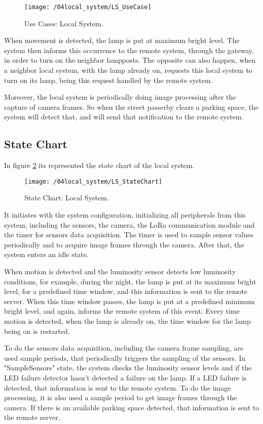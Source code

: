 \begin{figure}[ht] 
	\centering
	\texttt{[image: /04local\_system/LS\_UseCase]}
	\caption{Use Cases: Local System.}
	\label{fig:ls_use_cases}
\end{figure}

When movement is detected, the lamp is put at maximum bright level. The system then informs this occurrence to the remote system, through the gateway, in order to turn on the neighbor lampposts. The opposite can also happen, when a neighbor local system, with the lamp already on, requests this local system to turn on its lamp, being this request handled by the remote system. 

Moreover, the local system is periodically doing image processing after the capture of camera frames. So when the street passerby clears a parking space, the system will detect that, and will send that notification to the remote system.

\clearpage
\subsection{State Chart}
In figure \ref{fig:ls_state_chart} its represented the state chart of the local system. 

\begin{figure}[H]
	\centering
	\texttt{[image: /04local\_system/LS\_StateChart]}
	\caption{State Chart: Local System.}
	\label{fig:ls_state_chart}
\end{figure}

It initiates with the system configuration, initializing all peripherals from this system, including the sensors, the camera, the LoRa communication module and the timer for sensors data acquisition. The timer is used to sample sensor values periodically and to acquire image frames through the camera. After that, the system enters an idle state.

When motion is detected and the luminosity sensor detects low luminosity conditions, for example, during the night, the lamp is put at its maximum bright level, for a predefined time window, and this information is sent to the remote server. When this time window passes, the lamp is put at a predefined minimum bright level, and again, informs the remote system of this event. Every time motion is detected, when the lamp is already on, the time window for the lamp being on is restarted.

To do the sensors data acquisition, including the camera frame sampling, are used sample periods, that periodically triggers the sampling of the sensors. In "SampleSensors" state, the system checks the luminosity sensor levels and if the LED failure detector hasn't detected a failure on the lamp. If a LED failure is detected, that information is sent to the remote system. To do the image processing, it is also used a sample period to get image frames through the camera. If there is an available parking space detected, that information is sent to the remote server.

